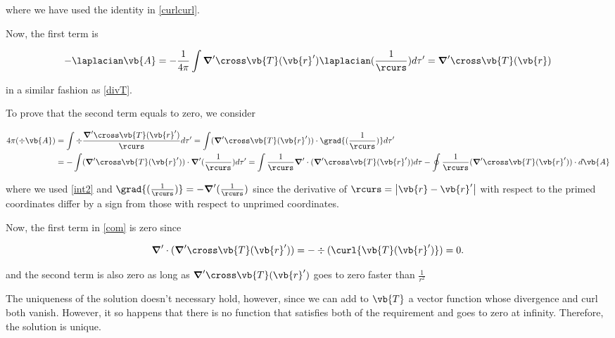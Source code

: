 \documentclass[english,a4paper,12pt]{report}
\begin{document}
where we have used the identity in \cref{curlcurl}.

Now, the first term is 

\begin{equation}
	-\laplacian \vb{A} = -\frac{1}{4\pi } \int \boldsymbol{\nabla}' \cross \vb{T} (\vb{r} ') \laplacian (\frac{1}{\rcurs } ) d\tau '= \boldsymbol{\nabla}' \cross \vb{T} (\vb{r} )
\end{equation}
	
in a similar fashion as \cref{divT}.

To prove that the second term equals to zero, we consider

\begin{equation}
	\begin{aligned}
		4\pi (\div{\vb{A} } ) &= \int \div{\frac{\boldsymbol{\nabla}' \cross \vb{T} (\vb{r} ')}{\rcurs }} d\tau ' = \int (\boldsymbol{\nabla}' \cross \vb{T} (\vb{r} ')) \cdot \grad{(\frac{1}{\rcurs } )} d\tau ' \\
	 	&= -\int (\boldsymbol{\nabla}' \cross \vb{T} (\vb{r} ')) \cdot \boldsymbol{\nabla}'(\frac{1}{\rcurs } ) d\tau ' = \int \frac{1}{\rcurs }\boldsymbol{\nabla}' \cdot (\boldsymbol{\nabla}' \cross \vb{T} (\vb{r} ')) d\tau  - \oint \frac{1}{\rcurs } (\boldsymbol{\nabla}' \cross \vb{T} (\vb{r} ')) \cdot d\vb{A}  \label{com} 
	\end{aligned}
\end{equation}

where we used \cref{int2} and \(\grad{(\frac{1}{\rcurs } )} = - \boldsymbol{\nabla}'(\frac{1}{\rcurs } ) \) since the derivative of \(\rcurs = \left| \vb{r} - \vb{r} ' \right| \) with respect to the primed coordinates differ by a sign from those with respect to unprimed coordinates.

Now, the first term in \cref{com} is zero since

\begin{equation}
	\boldsymbol{\nabla}' \cdot (\boldsymbol{\nabla}' \cross \vb{T} (\vb{r} ')) = - \div{(\curl{\vb{T} (\vb{r} ')})} = 0.
\end{equation}
	
and the second term is also zero as long as \(\boldsymbol{\nabla}' \cross \vb{T} (\vb{r} ') \) goes to zero faster than \(\frac{1}{r^2} \) 

	The uniqueness of the solution doesn't necessary hold, however, since we can add to \(\vb{T} \) a vector function whose divergence and curl both vanish. However, it so happens that there is no function that satisfies both of the requirement and goes to zero at infinity. Therefore, the solution is unique. 
\end{document}
